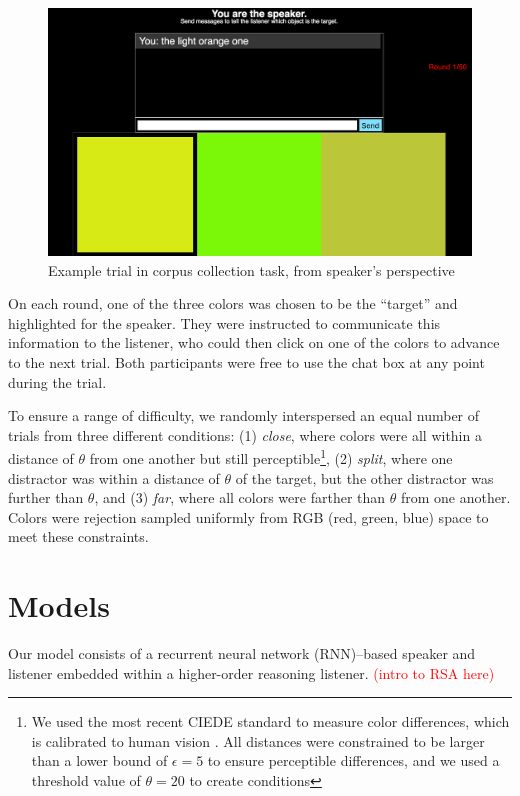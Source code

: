\documentclass[11pt,letterpaper]{article}
\renewcommand{\|}{\mid}
\newcommand{\todocheck}[1]{\textcolor{red}{#1}}
\begin{document}
\begin{figure}
\includegraphics[scale = .2]{figures/speakerView.png}
\caption{Example trial in corpus collection task, from speaker's perspective}
\label{fig:taskScreenshot}
\end{figure}

On each round, one of the three colors was chosen to be the ``target'' and highlighted for the speaker. They were instructed to communicate this information to the listener, who could then click on one of the colors to advance to the next trial. Both participants were free to use the chat box at any point during the trial. 

To ensure a range of difficulty, we randomly interspersed an equal number of trials from three different conditions: (1) \emph{close}, where colors were all within a distance of $\theta$ from one another but still perceptible\footnote{We used the most recent CIEDE standard to measure color differences, which is calibrated to human vision \cite{SharmaWuDalal05_DeltaE}. All distances were constrained to be larger than a lower bound of $\epsilon = 5$ to ensure perceptible differences, and we used a threshold value of $\theta = 20$ to create conditions}, (2) \emph{split}, where one distractor was within a distance of $\theta$ of the target, but the other distractor was further than $\theta$, and (3) \emph{far}, where all colors were farther than $\theta$ from one another. Colors were rejection sampled uniformly from RGB (red, green, blue) space to meet these constraints. 

\section{Models}

Our model consists of a recurrent neural network (RNN)--based speaker and listener 
embedded within a higher-order reasoning listener. \todocheck{(intro to RSA here)}
\end{document}
